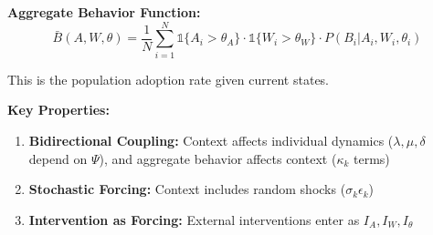 \begin{tcolorbox}[colback=purple!5!white, colframe=purple!75!black,
    title=\textbf{Theorem NTM-T6: Coupled ODE System (UNTCM Core)}]
\textbf{Aggregate Behavior Function:}
\begin{equation}
\bar{B}(A, W, \theta) = \frac{1}{N} \sum_{i=1}^{N} \mathbb{1}\{A_i > \theta_A\} \cdot \mathbb{1}\{W_i > \theta_W\} \cdot P(B_i | A_i, W_i, \theta_i)
\end{equation}

This is the population adoption rate given current states.

\textbf{Key Properties:}
\begin{enumerate}[nosep]
\item \textbf{Bidirectional Coupling:} Context affects individual dynamics ($\lambda, \mu, \delta$ depend on $\Psi$), and aggregate behavior affects context ($\kappa_k$ terms)
\item \textbf{Stochastic Forcing:} Context includes random shocks ($\sigma_k \epsilon_k$)
\item \textbf{Intervention as Forcing:} External interventions enter as $I_A, I_W, I_\theta$
\end{enumerate}

\end{tcolorbox}

